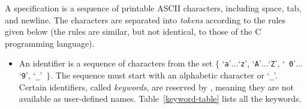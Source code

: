 A \todaysname{} specification is a sequence of printable ASCII
characters, including space, tab, and newline.  The characters are
separated into {\em tokens} according to the rules given below (the
rules are similar, but not identical, to those of the C programming
language).

\begin{itemize}

\item An {\nont identifier} is a sequence of characters from the set
$\{$ `{\tt a}'$\ldots$`{\tt z}', `{\tt A}'$\ldots$`{\tt Z}', `{\tt
0}'$\ldots$`{\tt 9}', `\verb|_|'~$\}$.  The sequence must start with
an alphabetic character or `\verb|_|'.  Certain identifiers, called
{\em keywords}, are reserved by \todaysname{}, meaning they are not
available as user-defined names.  Table~\ref{keyword-table} lists all
the keywords.


\end{itemize}
